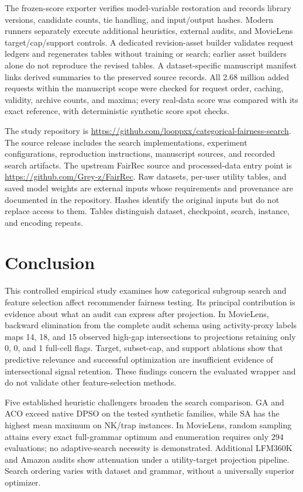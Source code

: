 The frozen-score exporter verifies model-variable restoration and records library versions, candidate counts, tie handling, and input/output hashes. Modern runners separately execute additional heuristics, external audits, and MovieLens target/cap/support controls. A dedicated revision-asset builder validates request ledgers and regenerates tables without training or search; earlier asset builders alone do not reproduce the revised tables. A dataset-specific manuscript manifest links derived summaries to the preserved source records. All 2.68 million added requests within the manuscript scope were checked for request order, caching, validity, archive counts, and maxima; every real-data score was compared with its exact reference, with deterministic synthetic score spot checks.

The study repository is \url{https://github.com/looppxx/categorical-fairness-search}. The source release includes the search implementations, experiment configurations, reproduction instructions, manuscript sources, and recorded search artifacts. The upstream FairRec source and processed-data entry point is \url{https://github.com/Grey-z/FairRec}. Raw datasets, per-user utility tables, and saved model weights are external inputs whose requirements and provenance are documented in the repository. Hashes identify the original inputs but do not replace access to them. Tables distinguish dataset, checkpoint, search, instance, and encoding repeats.

\section{Conclusion}
\label{sec:conclusion}

This controlled empirical study examines how categorical subgroup search and feature selection affect recommender fairness testing. Its principal contribution is evidence about what an audit can express after projection. In MovieLens, backward elimination from the complete audit schema using activity-proxy labels maps 14, 18, and 15 observed high-gap intersections to projections retaining only 0, 0, and 1 full-cell flags. Target, subset-cap, and support ablations show that predictive relevance and successful optimization are insufficient evidence of intersectional signal retention. These findings concern the evaluated wrapper and do not validate other feature-selection methods.

Five established heuristic challengers broaden the search comparison. GA and ACO exceed native DPSO on the tested synthetic families, while SA has the highest mean maximum on NK/trap instances. In MovieLens, random sampling attains every exact full-grammar optimum and enumeration requires only 294 evaluations; no adaptive-search necessity is demonstrated. Additional LFM360K and Amazon audits show attenuation under a utility-target projection pipeline. Search ordering varies with dataset and grammar, without a universally superior optimizer.


